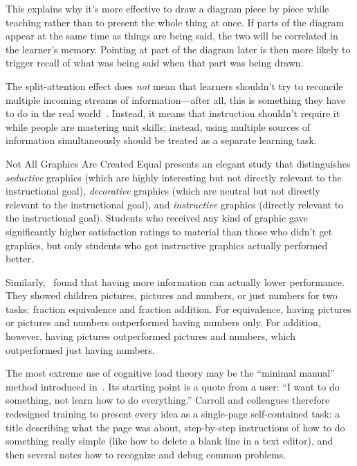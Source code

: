 This explains why it's more effective to draw a diagram piece by piece
while teaching rather than to present the whole thing at once. If parts
of the diagram appear at the same time as things are being said, the two
will be correlated in the learner's memory. Pointing at part of the
diagram later is then more likely to trigger recall of what was being
said when that part was being drawn.

The split-attention effect does \emph{not} mean that learners shouldn't try
to reconcile multiple incoming streams of information---after all, this is
something they have to do in the real world~\cite{Atki2000}. Instead,
it means that instruction shouldn't require it while people are
mastering unit skills; instead, using multiple sources of information
simultaneously should be treated as a separate learning task.

\begin{aside}{Not All Graphics Are Created Equal}
  \cite{Sung2012} presents an elegant study that distinguishes
  \emph{seductive} graphics (which are highly interesting but not directly
  relevant to the instructional goal), \emph{decorative} graphics (which are
  neutral but not directly relevant to the instructional goal), and
  \emph{instructive} graphics (directly relevant to the instructional goal).
  Students who received any kind of graphic gave significantly higher
  satisfaction ratings to material than those who didn't get graphics,
  but only students who got instructive graphics actually performed
  better.

  Similarly,~\cite{Stam2013,Stam2014} found that having more
  information can actually lower performance. They showed children
  pictures, pictures and numbers, or just numbers for two tasks:
  fraction equivalence and fraction addition. For equivalence, having
  pictures or pictures and numbers outperformed having numbers only. For
  addition, however, having pictures outperformed pictures and numbers,
  which outperformed just having numbers.
\end{aside}


The most extreme use of cognitive load theory may be the ``minimal
manual'' method introduced in~\cite{Carr1987}. Its starting point is
a quote from a user: ``I want to do something, not learn how to do
everything.'' Carroll and colleagues therefore redesigned training to
present every idea as a single-page self-contained task: a title
describing what the page was about, step-by-step instructions of how to
do something really simple (like how to delete a blank line in a text
editor), and then several notes how to recognize and debug common
problems.

